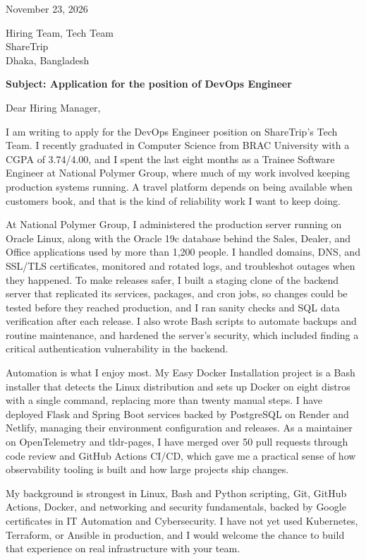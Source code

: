 \documentclass[a4paper]{article}
\begin{document}
\noindent November 23, 2026

\noindent Hiring Team, Tech Team \\
ShareTrip \\
Dhaka, Bangladesh

\noindent \textbf{Subject: Application for the position of DevOps Engineer}

\noindent Dear Hiring Manager,

\noindent I am writing to apply for the DevOps Engineer position on ShareTrip's Tech Team. I recently graduated in Computer Science from BRAC University with a CGPA of 3.74/4.00, and I spent the last eight months as a Trainee Software Engineer at National Polymer Group, where much of my work involved keeping production systems running. A travel platform depends on being available when customers book, and that is the kind of reliability work I want to keep doing.

\noindent At National Polymer Group, I administered the production server running on Oracle Linux, along with the Oracle 19c database behind the Sales, Dealer, and Office applications used by more than 1,200 people. I handled domains, DNS, and SSL/TLS certificates, monitored and rotated logs, and troubleshot outages when they happened. To make releases safer, I built a staging clone of the backend server that replicated its services, packages, and cron jobs, so changes could be tested before they reached production, and I ran sanity checks and SQL data verification after each release. I also wrote Bash scripts to automate backups and routine maintenance, and hardened the server's security, which included finding a critical authentication vulnerability in the backend.

\noindent Automation is what I enjoy most. My Easy Docker Installation project is a Bash installer that detects the Linux distribution and sets up Docker on eight distros with a single command, replacing more than twenty manual steps. I have deployed Flask and Spring Boot services backed by PostgreSQL on Render and Netlify, managing their environment configuration and releases. As a maintainer on OpenTelemetry and tldr-pages, I have merged over 50 pull requests through code review and GitHub Actions CI/CD, which gave me a practical sense of how observability tooling is built and how large projects ship changes.

\noindent My background is strongest in Linux, Bash and Python scripting, Git, GitHub Actions, Docker, and networking and security fundamentals, backed by Google certificates in IT Automation and Cybersecurity. I have not yet used Kubernetes, Terraform, or Ansible in production, and I would welcome the chance to build that experience on real infrastructure with your team.
\end{document}
